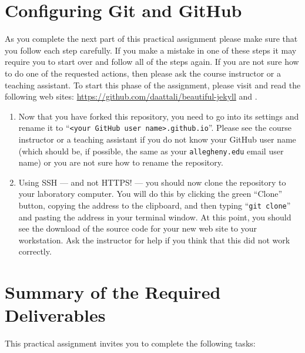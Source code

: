 \section*{Configuring Git and GitHub}

As you complete the next part of this practical assignment please make sure that you follow each step carefully. If you
make a mistake in one of these steps it may require you to start over and follow all of the steps again. If you are not
sure how to do one of the requested actions, then please ask the course instructor or a teaching assistant. To start
this phase of the assignment, please visit and read the following web sites:
\url{https://github.com/daattali/beautiful-jekyll} and \url{}.

\begin{enumerate}

  \item Now that you have forked this repository, you need to go into its settings and rename it to ``{\tt <your GitHub
    user name>.github.io}''. Please see the course instructor or a teaching assistant if you do not know your GitHub
    user name (which should be, if possible, the same as your {\tt allegheny.edu} email user name) or you are not sure
    how to rename the repository.

  \item Using SSH --- and not HTTPS! --- you should now clone the repository to your laboratory computer. You will do
    this by clicking the green ``Clone'' button, copying the address to the clipboard, and then typing ``{\tt git
    clone}'' and pasting the address in your terminal window. At this point, you should see the download of the source
    code for your new web site to your workstation. Ask the instructor for help if you think that this did not work
    correctly.

\end{enumerate}

\vspace*{-.175in}
\section*{Summary of the Required Deliverables}

This practical assignment invites you to complete the following tasks:

